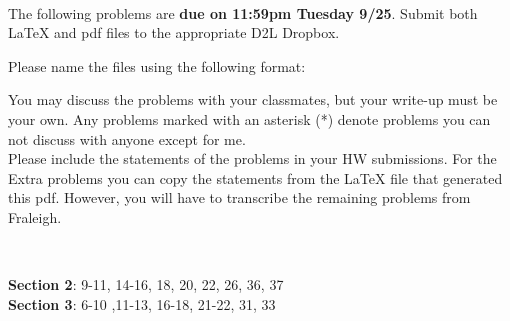 \documentclass[12pt]{article}
\begin{document}
	\hrulefill
	
	\
	
	The following problems are {\bf due on 11:59pm Tuesday 9/25}.  Submit both LaTeX and pdf files to the appropriate D2L Dropbox. 
	
	Please name the files using the following format:
	\begin{center}
	\end{center}
	
	You may discuss the problems with your classmates, but your write-up must be your own.  Any problems marked with an asterisk (*) denote problems you can not discuss with anyone except for me.\\
	
	Please include the statements of the problems in your HW submissions. For the Extra problems you can copy the statements from the LaTeX file that generated this pdf. However, you will have to transcribe the remaining problems from Fraleigh.
	
	\
	
	\textbf{Section 2}: 9-11, 14-16, 18, 20, 22, 26, 36, 37\\
	\textbf{Section 3}: 6-10 ,11-13, 16-18, 21-22, 31, 33\\
	
	
\end{document}
